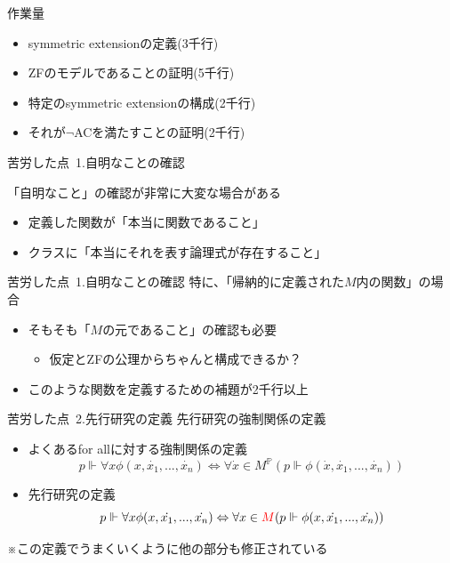 \documentclass[17pt,aspectratio=169]{beamer}
\newcommand{\Pbb}{\mathbb{P}}
\begin{document}
\begin{frame}{作業量}
    {\small
        \begin{itemize}[itemsep=8pt]
            \item symmetric extensionの定義(3千行)
            \item ZFのモデルであることの証明(5千行)
            \item 特定のsymmetric extensionの構成(2千行)
            \item それが$\neg$ACを満たすことの証明(2千行)
        \end{itemize} }
\end{frame}

\begin{frame}{苦労した点\, {\normalsize 1.自明なことの確認}}

    「自明なこと」の確認が非常に大変な場合がある

    {\small
    \begin{itemize}
        \item 定義した関数が「本当に関数であること」
        \item クラスに「本当にそれを表す論理式が存在すること」
    \end{itemize}
    }
\end{frame}

\begin{frame}{苦労した点\, {\normalsize 1.自明なことの確認}}
    特に、「帰納的に定義された$M$内の関数」の場合

    {\small
    \begin{itemize}
        \item そもそも「$M$の元であること」の確認も必要
              {\footnotesize
              \begin{itemize}
                  \item 仮定とZFの公理からちゃんと構成できるか？
              \end{itemize}}
        \item このような関数を定義するための補題が2千行以上
    \end{itemize}
    }
\end{frame}

\begin{frame}{苦労した点\, {\normalsize 2.先行研究の定義}}
    先行研究の強制関係の定義
    {\small
    \begin{itemize}[itemsep=8pt]
        \item よくあるfor allに対する強制関係の定義
              $$ p \Vdash \forall x \phi(x, \dot{x_1}, ..., \dot{x_n}) \Leftrightarrow \forall \dot{x} \in M^\Pbb(p \Vdash \phi(\dot{x}, \dot{x_1}, ..., \dot{x_n})) $$
        \item 先行研究の定義
              $$ p \Vdash \forall x \phi(x, \dot{x_1}, ..., \dot{x_n}) \Leftrightarrow \forall x \in \textcolor{red}{M}(p \Vdash \phi(x, \dot{x_1}, ..., \dot{x_n})) $$
    \end{itemize}
    \vspace{-6pt}
    \hspace{1cm}※この定義でうまくいくように他の部分も修正されている
    }
\end{frame}
\end{document}
